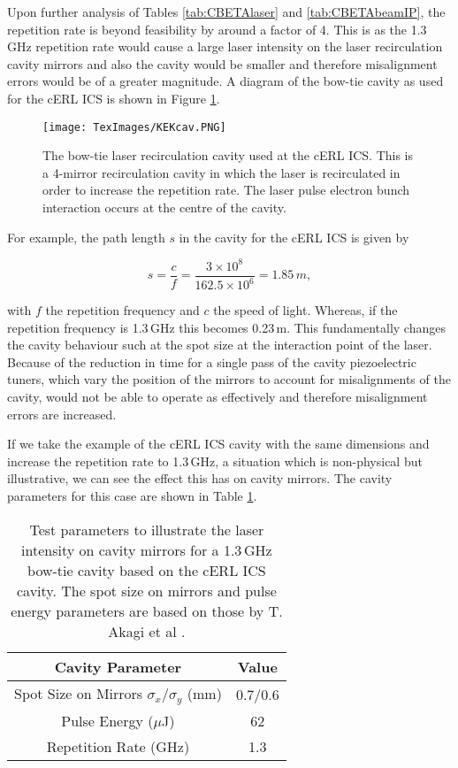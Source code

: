 \documentclass[11pt]{article}
\begin{document}
Upon further analysis of Tables \ref{tab:CBETAlaser} and \ref{tab:CBETAbeamIP}, the repetition rate is beyond feasibility by around a factor of 4. This is as the 1.3\,GHz repetition rate would cause a large laser intensity on the laser recirculation cavity mirrors and also the cavity would be smaller and therefore misalignment errors would be of a greater magnitude. A diagram of the bow-tie cavity as used for the cERL ICS is shown in Figure \ref{fig:KEKcav}.

\begin{figure}[H]
\centering
\texttt{[image: TexImages/KEKcav.PNG]}
\caption{\label{fig:KEKcav} The bow-tie laser recirculation cavity used at the cERL ICS. This is a 4-mirror recirculation cavity in which the laser is recirculated in order to increase the repetition rate. The laser pulse electron bunch interaction occurs at the centre of the cavity. }
\end{figure}

For example, the path length $s$ in the cavity for the cERL ICS is given by

\begin{equation}
s = \frac{c}{f} = \frac{3\times 10^{8}}{162.5\times10^{6}} = 1.85\,m,
\label{eq:cavpath}
\end{equation}

\noindent with $f$ the repetition frequency and $c$ the speed of light. Whereas, if the repetition frequency is 1.3\,GHz this becomes 0.23\,m. This fundamentally changes the cavity behaviour such at the spot size at the interaction point of the laser. Because of the reduction in time for a single pass of the cavity piezoelectric tuners, which vary the position of the mirrors to account for misalignments of the cavity, would not be able to operate as effectively and therefore misalignment errors are increased.      

If we take the example of the cERL ICS \cite{TAkagicERL} cavity with the same dimensions and increase the repetition rate to 1.3\,GHz, a situation which is non-physical but illustrative, we can see the effect this has on cavity mirrors. The cavity parameters for this case are shown in Table \ref{tab:cERLcav}.

\begin{table}[H]
\centering
\begin{tabular}{|c||c|}
\hline
\textbf{Cavity Parameter} & \textbf{Value} \\
\hline
Spot Size on Mirrors $\sigma_{x}/\sigma_{y}$ (mm) & 0.7/0.6 \\
\hline
Pulse Energy ($\mu$J) & 62 \\
\hline
Repetition Rate (GHz) & 1.3 \\
\hline
\end{tabular}
\caption{\label{tab:cERLcav} Test parameters to illustrate the laser intensity on cavity mirrors for a 1.3\,GHz bow-tie cavity based on the cERL ICS cavity. The spot size on mirrors and pulse energy parameters are based on those by T. Akagi et al \cite{TAkagicERL}.}
\end{table}
\end{document}
